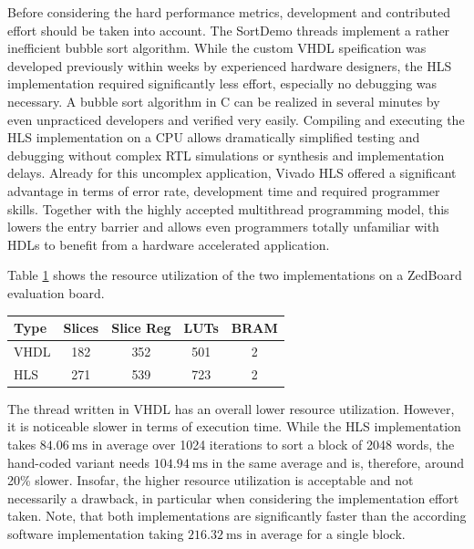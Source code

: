 Before considering the hard performance metrics, development and contributed
effort should be taken into account. The SortDemo threads implement a rather
inefficient bubble sort algorithm. While the custom \ac{VHDL} speification was
developed previously within weeks by experienced hardware designers, the
\ac{HLS} implementation required significantly less effort, especially no
debugging was necessary. A bubble sort algorithm in C can be realized in
several minutes by even unpracticed developers and verified very easily.
Compiling and executing the \ac{HLS} implementation on a \ac{CPU} allows
dramatically simplified testing and debugging without complex \ac{RTL}
simulations or synthesis and implementation delays. Already for this uncomplex
application, Vivado HLS offered a significant advantage in terms of error
rate, development time and required programmer skills. Together with the
highly accepted multithread programming model, this lowers the entry barrier
and allows even programmers totally unfamiliar with \acp{HDL} to benefit from
a hardware accelerated application.

Table \ref{tab:hls_util} shows the resource utilization of the two
implementations on a ZedBoard evaluation board.
\begin{table}
	\centering
	\label{tab:hls_util}
	\begin{tabular}{lcccc}
	\hline
	\textbf{Type} & \textbf{Slices} & \textbf{Slice Reg} & \textbf{LUTs} & \textbf{BRAM}\\
	\hline
	\ac{VHDL} & 182 & 352 & 501 & 2\\
	\ac{HLS} & 271 & 539 & 723 & 2\\
	\hline
	\end{tabular}
\end{table}
The thread written in \ac{VHDL} has an overall lower resource utilization.
However, it is noticeable slower in terms of execution time. While the
\ac{HLS} implementation takes $\SI{84.06}{\milli\second}$ in average over 1024
iterations to sort a block of 2048 words, the hand-coded variant needs
$\SI{104.94}{\milli\second}$ in the same average and is, therefore, around
20\% slower. Insofar, the higher resource utilization is acceptable and not
necessarily a drawback, in particular when considering the implementation
effort taken. Note, that both implementations are significantly faster than
the according software implementation taking $\SI{216.32}{\milli\second}$ in
average for a single block.

